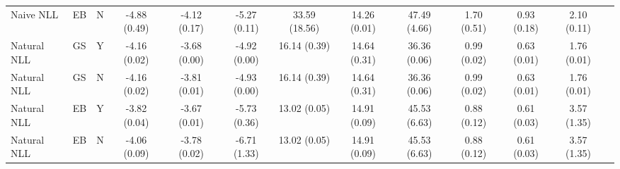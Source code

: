 \begin{table}
\begin{tabular}{|l|l|l|c|c|c|c|c|c|c|c|c|c|}
        Naive NLL &             EB &                    N &         -4.88 (0.49) & -4.12 (0.17) & -5.27 (0.11) &   33.59 (18.56) &     14.26 (0.01) &      47.49 (4.66) &       1.70 (0.51) &        0.93 (0.18) &         2.10 (0.11) \\
      Natural NLL &             GS &                    Y &         -4.16 (0.02) & -3.68 (0.00) & -4.92 (0.00) &    16.14 (0.39) &     14.64 (0.31) &      36.36 (0.06) &       0.99 (0.02) &        0.63 (0.01) &         1.76 (0.01) \\
      Natural NLL &             GS &                    N &         -4.16 (0.02) & -3.81 (0.01) & -4.93 (0.00) &    16.14 (0.39) &     14.64 (0.31) &      36.36 (0.06) &       0.99 (0.02) &        0.63 (0.01) &         1.76 (0.01) \\
      Natural NLL &             EB &                    Y &         -3.82 (0.04) & -3.67 (0.01) & -5.73 (0.36) &    13.02 (0.05) &     14.91 (0.09) &      45.53 (6.63) &       0.88 (0.12) &        0.61 (0.03) &         3.57 (1.35) \\
      Natural NLL &             EB &                    N &         -4.06 (0.09) & -3.78 (0.02) & -6.71 (1.33) &    13.02 (0.05) &     14.91 (0.09) &      45.53 (6.63) &       0.88 (0.12) &        0.61 (0.03) &         3.57 (1.35) \\
\bottomrule
\end{tabular}
\end{table}
